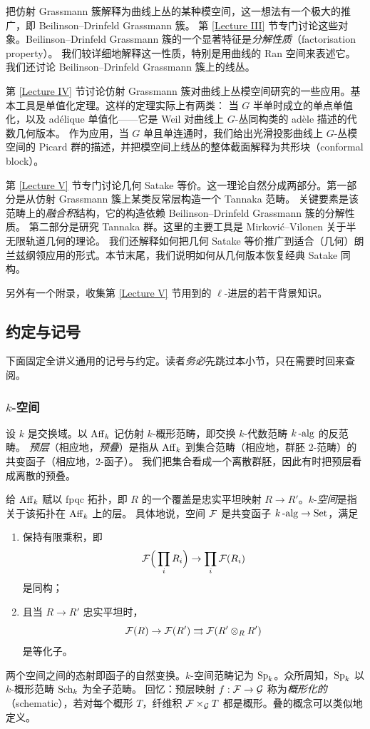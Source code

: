 把仿射 Grassmann 簇解释为曲线上丛的某种模空间，这一想法有一个极大的推广，即 Beilinson--Drinfeld Grassmann 簇。
第 \ref{Lecture III} 节专门讨论这些对象。Beilinson--Drinfeld Grassmann 簇的一个显著特征是\emph{分解性质}（factorisation property）。
我们较详细地解释这一性质，特别是用曲线的 Ran 空间来表述它。我们还讨论 Beilinson--Drinfeld Grassmann 簇上的线丛。

第 \ref{Lecture IV} 节讨论仿射 Grassmann 簇对曲线上丛模空间研究的一些应用。基本工具是单值化定理。这样的定理实际上有两类：
当 $G$ 半单时成立的单点单值化，以及 ad\'elique 单值化——它是 Weil 对曲线上 $G$-丛同构类的 ad\`ele 描述的代数几何版本。
作为应用，当 $G$ 单且单连通时，我们给出光滑投影曲线上 $G$-丛模空间的 Picard 群的描述，并把模空间上线丛的整体截面解释为共形块（conformal block）。

第 \ref{Lecture V} 节专门讨论几何 Satake 等价。这一理论自然分成两部分。第一部分是从仿射 Grassmann 簇上某类反常层构造一个 Tannaka 范畴。
关键要素是该范畴上的\emph{融合积}结构，它的构造依赖 Beilinson--Drinfeld Grassmann 簇的分解性质。
第二部分是研究 Tannaka 群。这里的主要工具是 Mirkovi\'c--Vilonen 关于半无限轨道几何的理论。
我们还解释如何把几何 Satake 等价推广到适合（几何）朗兰兹纲领应用的形式。本节末尾，我们说明如何从几何版本恢复经典 Satake 同构。

另外有一个附录，收集第 \ref{Lecture V} 节用到的 $\ell$-进层的若干背景知识。

\subsection{约定与记号}

下面固定全讲义通用的记号与约定。读者\emph{务必}先跳过本小节，只在需要时回来查阅。

\subsubsection{$k$-空间}\label{Intro:sp}

设 $k$ 是交换域。以 $\operatorname{Aff}_k$ 记仿射 $k$-概形范畴，即交换 $k$-代数范畴 $k\operatorname{-alg}$ 的反范畴。
\emph{预层}（相应地，\emph{预叠}）是指从 ${\operatorname{Aff}}_k$ 到集合范畴（相应地，群胚 $2$-范畴）的共变函子（相应地，$2$-函子）。
我们把集合看成一个离散群胚，因此有时把预层看成离散的预叠。

给 ${\operatorname{Aff}}_k$ 赋以 fpqc 拓扑，即 $R$ 的一个覆盖是忠实平坦映射 $R\to R'$。$k$-\emph{空间}是指关于该拓扑在 ${\operatorname{Aff}}_k$ 上的层。
具体地说，空间 ${\mathcal F}$ 是共变函子 $k\operatorname{-alg}\to \operatorname{Set}$，满足
\begin{enumerate}
\item 保持有限乘积，即
\[
{\mathcal F}\Big(\prod_i R_i\Big)\to \prod_i {\mathcal F}(R_i)
\]
是同构；
\item 且当 $R\to R'$ 忠实平坦时，
\begin{equation}\label{fpqc sheaf}
{\mathcal F}(R)\to {\mathcal F}(R')\rightrightarrows{\mathcal F}(R'\otimes_RR')
\end{equation}
是等化子。
\end{enumerate}
两个空间之间的态射即函子的自然变换。$k$-空间范畴记为 $\operatorname{Sp}_k$。众所周知，$\operatorname{Sp}_k$ 以 $k$-概形范畴 $\operatorname{Sch}_k$ 为全子范畴。
回忆：预层映射 $f:{\mathcal F}\to{\mathcal G}$ 称为\emph{概形化的}（schematic），若对每个概形 $T$，纤维积 ${\mathcal F}\times_{{\mathcal G}}T$ 都是概形。叠的概念可以类似地定义。


